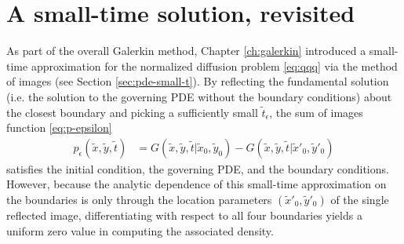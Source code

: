 \section{A small-time solution, revisited}
As part of the overall Galerkin method, Chapter \ref{ch:galerkin}
introduced a small-time approximation for the normalized diffusion
problem \eqref{eq:qqq} via the method of images (see Section
\ref{sec:pde-small-t}). By reflecting the fundamental solution
(i.e. the solution to the governing PDE without the boundary conditions) about the
closest boundary and picking a sufficiently small
$\tilde{t}_\epsilon$, the sum of images function \eqref{eq:p-epsilon}
\begin{align*}
  p_\epsilon(\tilde{x}, \tilde{y}, \tilde{t}) &= G(\tilde{x}, \tilde{y}, \tilde{t} | \tilde{x}_0, \tilde{y}_0) - G(\tilde{x}, \tilde{y}, \tilde{t} | \tilde{x}'_0, \tilde{y}'_0)
\end{align*}
satisfies the initial condition, the governing PDE, and the boundary
conditions. However, because the analytic dependence of this
small-time approximation on the boundaries is only through the
location parameters $(\tilde{x}'_0, \tilde{y}'_0)$ of the single
reflected image, differentiating with respect to all four boundaries
yields a uniform zero value in computing the associated density.

